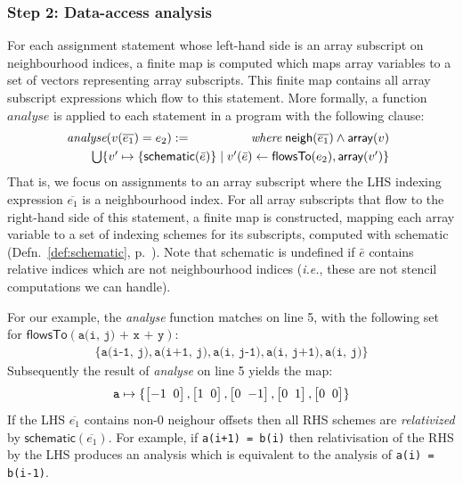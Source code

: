 \documentclass[9pt]{sigplanconf}
\theoremstyle{definition}
\newcommand{\ie}{\emph{i.e.}}
\newcommand{\neigh}{\textsf{neigh}}
\newcommand{\arrayTy}{\textsf{array}}
\newcommand{\vtwoh}[2]{\setlength{\arraycolsep}{0em}
\left[\begin{array}{cc}#1 \; & \; #2\end{array}\right]}
\begin{document}
\subsubsection{Step 2: Data-access analysis}
\label{sec:inf-step2}

For each assignment statement whose left-hand side is an array
subscript on neighbourhood indices, a finite map is computed which
maps array variables to a set of vectors representing array
subscripts.  This finite map contains all array subscript expressions
which flow to this statement. More formally, a function
$\textit{analyse}$ is applied to each statement in a program with the
following clause:
%
\begin{align*}
\hspace{-0.5em}
\begin{array}{lr}
\textit{analyse}(v(\overline{e_1}) = e_2)
 := \qquad\qquad & \textit{where} \; \neigh(\overline{e_1}) \wedge \arrayTy(v)  \\[0.3em]
\multicolumn{2}{l}{\qquad \bigcup\{v' \mapsto \{
\textsf{schematic}(\bar{e})\} \mid v'(\bar{e}) \leftarrow \mathsf{flowsTo}(e_2),
  \arrayTy(v')\}}
\end{array}
\end{align*}
%
That is, we focus on assignments to an array subscript where the LHS 
indexing expression $\overline{e_1}$ is a neighbourhood index.  For
all array subscripts that flow to the right-hand side of this
statement, a finite map is constructed, mapping each array variable
to a set of indexing schemes for its subscripts, computed
with \textsf{schematic} (Defn.~\ref{def:schematic},
p.~\pageref{def:schematic}).
 Note that \textsf{schematic} is undefined if
$\bar{e}$ contains relative indices which are not neighbourhood
indices (\ie{}, these are not stencil computations we can handle). 

For our example, the \textit{analyse} function matches on
line 5, with the following set for $\textsf{flowsTo}(\texttt{a(i, j) + x +
  y})$:
%
\begin{align*}
\{\texttt{a(i-1, j)}, \texttt{a(i+1, j)}, \texttt{a(i, j-1)},
  \texttt{a(i, j+1)}, \texttt{a(i, j)}\}
\end{align*}
Subsequently the result of \textit{analyse} on line 5 yields the map:
\begin{align*}
\texttt{a} \mapsto \{\vtwoh{-1}{0}, \vtwoh{1}{0},
          \vtwoh{0}{-1}, \vtwoh{0}{1}, \vtwoh{0}{0}\}
\end{align*}
%
If the LHS $\overline{e_1}$ contains non-$0$ neighour offsets 
then all RHS schemes are \emph{relativized} by
$\textsf{schematic}(\overline{e_1})$. For example, 
if \texttt{a(i+1) = b(i)} then relativisation of the RHS by the LHS
produces an analysis which is equivalent to the analysis of \texttt{a(i) = b(i-1)}. 
\end{document}
